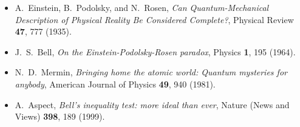 \documentclass[pra,11pt]{revtex4}
\begin{document}
\begin{itemize}
\item A.~Einstein, B.~Podolsky, and N.~Rosen,
  \textit{Can Quantum-Mechanical Description of Physical Reality Be
    Considered Complete?}, Physical Review \textbf{47}, 777 (1935).

\item J.~S.~Bell, \textit{On the Einstein-Podolsky-Rosen paradox},
  Physics \textbf{1}, 195 (1964).
  
\item N.~D.~Mermin, \textit{Bringing home the atomic world: Quantum
  mysteries for anybody}, American Journal of Physics \textbf{49}, 940
  (1981).

\item A.~Aspect, \textit{Bell's inequality test: more ideal than ever},
  Nature (News and Views) \textbf{398}, 189 (1999).
\end{itemize}
\end{document}
